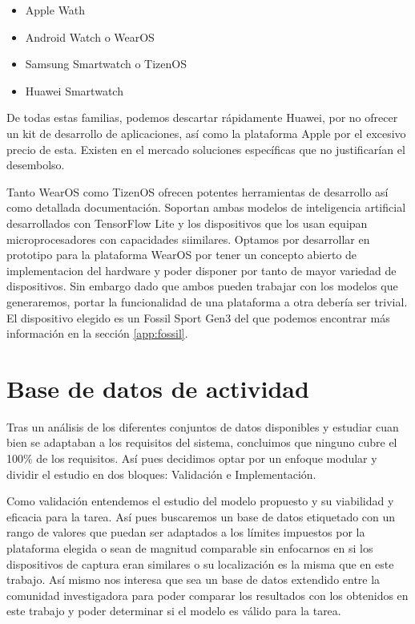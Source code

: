 \documentclass[../tfm.tex]{subfiles}
\begin{document}
\begin{itemize}
  \item{Apple Wath}
  \item{Android Watch o WearOS}
  \item{Samsung Smartwatch o TizenOS}
  \item{Huawei Smartwatch}
\end{itemize}

De todas estas familias, podemos descartar rápidamente Huawei, por no ofrecer un kit de desarrollo de aplicaciones, así como la plataforma Apple por el excesivo precio de esta. Existen en el mercado soluciones específicas que no justificarían el desembolso.

Tanto WearOS como TizenOS ofrecen potentes herramientas de desarrollo así como detallada documentación. Soportan ambas modelos de inteligencia artificial desarrollados con TensorFlow Lite y los dispositivos que los usan equipan microprocesadores con capacidades siimilares. Optamos por desarrollar en prototipo para la plataforma WearOS por tener un concepto abierto de implementacion del hardware y poder disponer por tanto de mayor variedad de dispositivos. Sin embargo dado que ambos pueden trabajar con los modelos que generaremos, portar la funcionalidad de una plataforma a otra debería ser trivial. El dispositivo elegido es un Fossil Sport Gen3 del que podemos encontrar más información en la sección \ref{app:fossil}.


\section{Base de datos de actividad}\label{req_base de datos}
Tras un análisis de los diferentes conjuntos de datos disponibles y estudiar cuan bien se adaptaban a los requisitos del sistema, concluimos que ninguno cubre el 100\% de los requisitos. Así pues decidimos optar por un enfoque modular y dividir el estudio en dos bloques: Validación e Implementación.

Como validación entendemos el estudio del modelo propuesto y su viabilidad y eficacia para la tarea. Así pues buscaremos un base de datos etiquetado con un rango de valores que puedan ser adaptados a los límites impuestos por la plataforma elegida o sean de magnitud comparable sin enfocarnos en si los dispositivos de captura eran similares o su localización es la misma que en este trabajo. Así mismo nos interesa que sea un base de datos extendido entre la comunidad investigadora para poder comparar los resultados con los obtenidos en este trabajo y poder determinar si el modelo es válido para la tarea.
\end{document}
